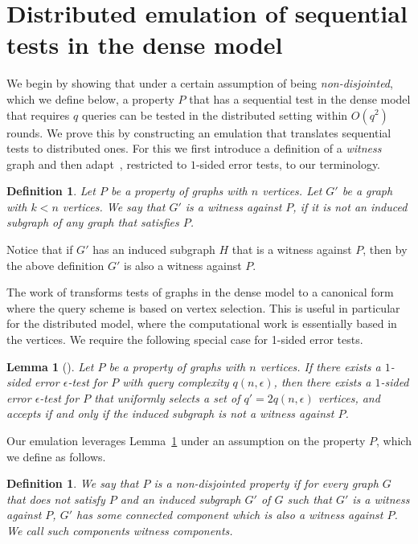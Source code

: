 \documentclass[11pt]{article}
\newtheorem{lemma}[theorem]{Lemma}
\newtheorem{definition}[theorem]{Definition}
\begin{document}
\section{Distributed emulation of sequential tests in the dense model}
\label{sec:emulation}
We begin by showing that under a certain assumption of being \emph{non-disjointed}, which we define below, a property $P$ that has a sequential test in the dense model that requires $q$ queries can be tested in the distributed setting within $O(q^2)$ rounds.
We prove this by constructing an emulation that translates sequential tests to distributed ones. For this we first introduce a definition of a \emph{witness} graph and then adapt~\cite[Theorem 2.2]{Goldreich}, restricted to $1$-sided error tests, to our terminology.

\begin{definition}
\label{def:rejected-graph}
Let $P$ be a property of graphs with $n$ vertices. Let $G'$ be a graph with $k<n$ vertices. We say that $G'$ is a \emph{witness against $P$}, if it is not an induced subgraph of any graph that satisfies $P$.		
\end{definition}
Notice that if $G'$ has an induced subgraph $H$ that is a witness against $P$, then by the above
definition $G'$ is also a witness against $P$.\par
The work of \cite{Goldreich} transforms tests of graphs in the dense model to a canonical form where the query scheme is based on vertex selection. This is useful in particular for the distributed model, where the computational work is essentially based in the vertices. We require the following special case for 1-sided error tests.

\begin{lemma}[\textbf{\cite[Theorem 2.2]{Goldreich}}]
\label{claim:canonical-tester}
Let $P$ be a property of graphs with $n$ vertices.
If there exists a $1$-sided error $\epsilon$-test for $P$ with query complexity $q(n, \epsilon)$, then there exists a $1$-sided error $\epsilon$-test for $P$ that uniformly selects a set of $q'=2q(n, \epsilon)$ vertices, and accepts if and only if the induced subgraph is not a witness against $P$.
\end{lemma}


Our emulation leverages Lemma~\ref{claim:canonical-tester} under an assumption on the property $P$, which we define as follows.
\begin{definition}
We say that $P$ is a \emph{non-disjointed} property if for every graph $G$ that does not satisfy $P$ and an induced subgraph $G'$ of $G$ such that $G'$ is a witness against $P$, $G'$ has some connected component which is also a witness against $P$. We call such components \emph{witness components}.
\end{definition}
\end{document}
